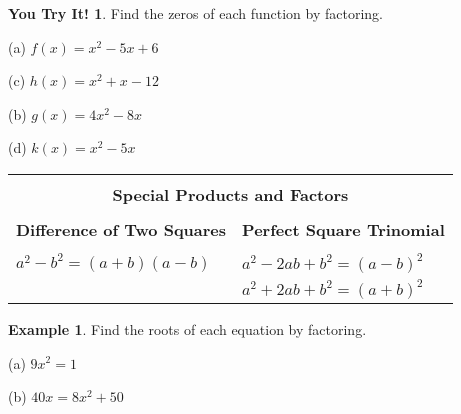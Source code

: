 \documentclass{report}
\theoremstyle{definition}
\newtheorem{example}{\bf Example}
\newtheorem{youtry}{\textbf{You Try It!}}
\begin{document}
\vspace{2cm}

 \newpage

\begin{youtry}
Find the zeros of each function by factoring.
\end{youtry}

\begin{minipage}[t]{0.45\linewidth}
(a) $f(x)=x^2-5x+6$
\vspace{3cm}

(c) $h(x)=x^2+x-12$
\end{minipage}
\hfill
\begin{minipage}[t]{0.45\linewidth}
(b) $g(x)=4x^2-8x$
\vspace{3cm}

(d) $k(x)=x^2-5x$
\end{minipage}

\vspace{2cm}

\begin{center}
	\begin{tabular}{|l|l|}
		\hline
		\multicolumn{2}{|l|}{}\\
		\multicolumn{2}{|c|}{\large\textbf{Special Products and Factors} \normalsize}\\
		\hline
		&\\
		\multicolumn{1}{|c|}{\textbf{Difference of Two Squares}}&\multicolumn{1}{c|}{\textbf{Perfect Square Trinomial}}\\
		\hline
		&\\
		$a^2-b^2=(a+b)(a-b)$& $a^2-2ab+b^2=(a-b)^2$\\
		&$a^2+2ab+b^2=(a+b)^2$\\
		\hline
	\end{tabular}
\end{center}

\begin{example}
Find the roots of each equation by factoring.
\end{example}

\begin{minipage}[t]{0.45\linewidth}
(a) $9x^2=1$
\vspace{3cm}
\end{minipage}
\hfill
\begin{minipage}[t]{0.45\linewidth}
(b) $40x=8x^2+50$
\vspace{3cm}
\end{minipage}
\end{document}
